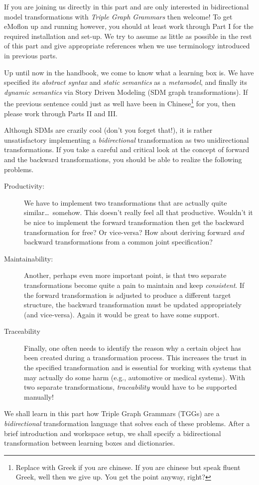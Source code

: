 \genHeader
\label{chap:Learning-Box-to-Dictionary-and-Back-Again}


If you are joining us directly in this part and are only interested in bidirectional model transformations with \emph{Triple Graph Grammars} then welcome! To
get eMoflon up and running however, you should at least work through Part I for the required installation and set-up. We try to assume as little as possible in
the rest of this part and give appropriate references when we use terminology introduced in previous parts.

Up until now in the handbook, we come to know what a learning box is. We have specified its \emph{abstract syntax} and \emph{static semantics} as a
\emph{metamodel}, and finally its \emph{dynamic semantics} via Story Driven Modeling (SDM graph transformations). If the previous sentence could just as well
have been in Chinese\footnote{Replace with Greek if you are chinese.  If you are chinese but speak fluent Greek, well then we give up. You get the point
anyway, right?} for you, then please work through Parts II and III.

Although SDMs are crazily cool (don't you forget that!), it is rather unsatisfactory implementing a \emph{bidirectional} transformation as two unidirectional
transformations. If you take a careful and critical look at the concept of forward and the backward transformations, you should be able to realize the following
problems.

\begin{description}
  \item[Productivity:] We have to implement two transformations that are actually quite similar\ldots ~somehow. This doesn't really feel all that productive.
  Wouldn't it be nice to implement the forward transformation then get the backward transformation for free?  Or vice-versa?  How about deriving forward 
  \emph{and} backward transformations from a common joint specification?
  
  \vspace{0.5cm}
  
  \item[Maintainability:] Another, perhaps even more important point, is that two separate transformations become quite a pain to maintain and keep
  \emph{consistent}.  If the forward transformation is adjusted to produce a different target structure, the backward transformation must be updated
  appropriately (and vice-versa).  Again it would be great to have some support.
  
  \item[Traceability] Finally, one often needs to identify the reason why a certain object has been created during a transformation process. This increases the
  trust in the specified transformation and is essential for working with systems that may actually do some harm (e.g., automotive or medical     
  systems). With two separate transformations, \emph{traceability} would have to be supported manually!
\end{description}

We shall learn in this part how Triple Graph Grammars (TGGs) are a \emph{bidirectional} transformation language that solves each of these problems. After a
brief introduction and workspace setup, we shall specify a bidirectional transformation between learning boxes and dictionaries.
